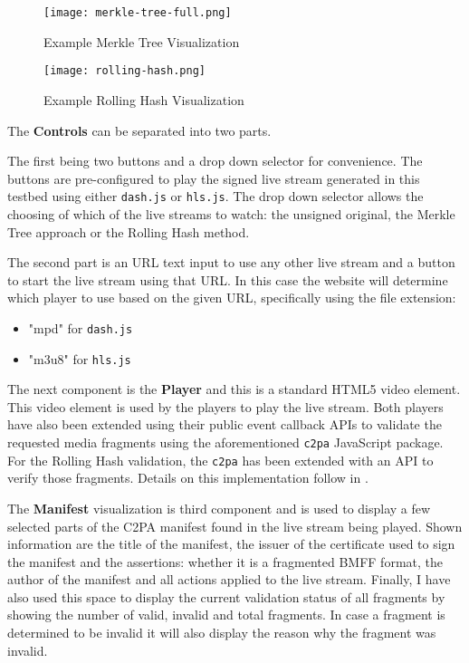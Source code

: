 \begin{figure}
    \centering
    \texttt{[image: merkle-tree-full.png]}
    \caption{Example Merkle Tree Visualization}
    \label{fig:merkle_tree}
\end{figure}
\begin{figure}
    \centering
    \texttt{[image: rolling-hash.png]}
    \caption{Example Rolling Hash Visualization}
    \label{fig:rolling_hash}
\end{figure}

The \textbf{Controls} can be separated into two parts. 

The first being two buttons and a drop down selector for convenience. The buttons are pre-configured to play the signed live stream generated in this testbed using either \texttt{dash.js} or \texttt{hls.js}. The drop down selector allows the choosing of which of the live streams to watch: the unsigned original, the Merkle Tree approach or the Rolling Hash method.

The second part is an URL text input to use any other live stream and a button to start the live stream using that URL. In this case the website will determine which player to use based on the given URL, specifically using the file extension:

\begin{itemize}
    \item "mpd" for \texttt{dash.js}
    \item "m3u8" for \texttt{hls.js}
\end{itemize}

The next component is the \textbf{Player} and this is a standard HTML5 video element. This video element is used by the players to play the live stream. Both players have also been extended using their public event callback APIs to validate the requested media fragments using the aforementioned \texttt{c2pa} JavaScript package. For the Rolling Hash validation, the \texttt{c2pa} has been extended with an API to verify those fragments. Details on this implementation follow in .

The \textbf{Manifest} visualization is third component and is used to display a few selected parts of the C2PA manifest found in the live stream being played. Shown information are the title of the manifest, the issuer of the certificate used to sign the manifest and the assertions: whether it is a fragmented BMFF format, the author of the manifest and all actions applied to the live stream. Finally, I have also used this space to display the current validation status of all fragments by showing the number of valid, invalid and total fragments. In case a fragment is determined to be invalid it will also display the reason why the fragment was invalid.

